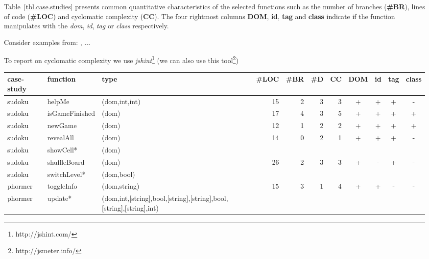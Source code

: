 \documentclass[sigconf]{acmart}
\begin{document}
Table~\ref{tbl.case.studies} presents common quantitative characteristics of the selected functions such as the number of branches (\textbf{\#BR}), lines of code (\textbf{\#LOC}) and cyclomatic complexity (\textbf{CC}). The four rightmost columns \textbf{DOM}, \textbf{id}, \textbf{tag} and \textbf{class} indicate if the function manipulates with the \emph{dom}, \emph{id}, \emph{tag} or \emph{class} respectively.       


Consider examples from: \cite{artemis2011}, \cite{dom2011}...

To report on cyclomatic complexity we use \emph{jshint}\footnote{http://jshint.com/} (we can also use this tool\footnote{http://jsmeter.info/})

\begin{table*}
  \caption{Summary of the case studies}
  \label{tbl.case.studies}
    \scriptsize
  \begin{tabular}{l|l|l|r|r|r|r|c|c|c|c}
    \toprule
    \textbf{case-study} & \textbf{function} & \textbf{type} & \textbf{\#LOC} & \textbf{\#BR} & \textbf{\#D} & \textbf{CC} & \textbf{DOM} & \textbf{id} & \textbf{tag} & \textbf{class} \\
    \midrule
    sudoku     & helpMe & (dom,int,int)                                   & 15 & 2  & 3 & 3  & + & + & + & - \\
    sudoku     & isGameFinished & (dom)                                   & 17 & 4  & 3 & 5  & + & + & + & + \\
    sudoku     & newGame & (dom)                                          & 12 & 1  & 2 & 2  & + & + & + & + \\
    sudoku     & revealAll & (dom)                                        & 14 & 0  & 2 & 1  & + & + & + & - \\
    sudoku     & showCell* & (dom)                                         &    &    &   &    &   &   &   & \\
    sudoku     & shuffleBoard & (dom)                                     & 26 & 2  & 3 & 3  & + & - & + & - \\
    sudoku     & switchLevel* & (dom,bool)                                 &    &    &   &    &   &   &   & \\
    \midrule
    phormer    & toggleInfo & (dom,string)                                & 15 & 3  & 1 & 4  & + & + & - & - \\
    phormer    & update* & (dom,int,[string],bool,[string],[string],bool,[string],[string],int) &    &    &   &    &   &   &   & \\

\end{tabular}
\end{table*}
\end{document}
